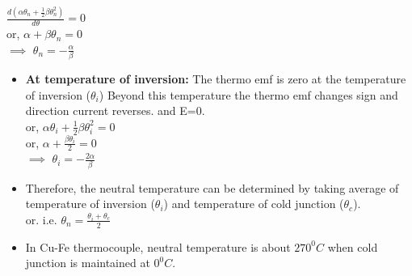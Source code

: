 \documentclass{beamer}
\begin{document}
\begin{frame}

\hspace{1cm} $\frac{d(\alpha\theta_n+\frac{1}{2}\beta\theta_n^2)}{d\theta}=0$\\
or, \hspace{3cm}$\alpha+\beta\theta_n=0$\\
$\implies$ \hspace{5cm} $\theta_n=-\frac{\alpha}{\beta}$

\begin{itemize}
\item \textbf{At temperature of inversion:} The thermo emf is zero at the temperature of inversion ($\theta_i$) Beyond this temperature the thermo emf changes sign and direction current reverses. and E=0.\\
or, \hspace{2cm} $\alpha\theta_i+\frac{1}{2}\beta\theta_i^2=0$\\
or, \hspace{4cm} $\alpha+\frac{\beta\theta_i}{2}=0$\\
$\implies$ \hspace{6cm} $\theta_i=-\frac{2\alpha}{\beta}$
\item Therefore, the neutral temperature can be determined by taking average of temperature of inversion ($\theta_i$) and temperature of cold junction ($\theta_c$).\\
or. \hspace{2cm} i.e. $\theta_n=\frac{\theta_i+\theta_c}{2}$
\item In Cu-Fe thermocouple, neutral temperature is about $270^0 C$ when cold junction is maintained at $0^0C$.
\end{itemize}

\end{frame}
\end{document}

